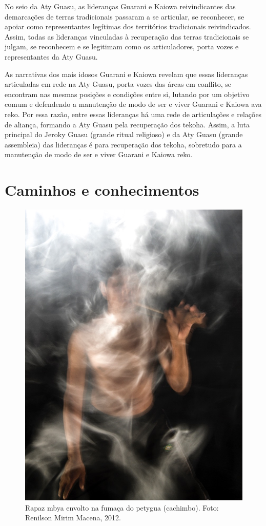 No seio da Aty Guasu, as lideranças Guarani e Kaiowa reivindicantes das
demarcações de terras tradicionais passaram a se articular, se
reconhecer, se apoiar como representantes legítimas dos territórios
tradicionais reivindicados. Assim, todas as lideranças vinculadas à
recuperação das terras tradicionais se julgam, se reconhecem e se
legitimam como os articuladores, porta vozes e representantes da Aty
Guasu. 

As narrativas dos mais idosos Guarani e Kaiowa revelam que essas
lideranças articuladas em rede na Aty Guasu, porta vozes das áreas em
conflito, se encontram nas mesmas posições e condições entre si,
lutando por um objetivo comum e defendendo a manutenção de modo de ser
e viver Guarani e Kaiowa ava reko. Por essa razão, entre essas
lideranças há uma rede de articulações e relações de aliança, formando
a Aty Guasu pela recuperação dos tekoha. Assim, a luta principal do
Jeroky Guasu (grande ritual religioso) e da Aty Guasu (grande
assembleia) das lideranças é para recuperação dos tekoha, sobretudo
para a manutenção de modo de ser e viver Guarani e Kaiowa reko.

\part{Caminhos e conhecimentos}

 \begin{figure}
  \centering
 \includegraphics[width=\textwidth]{./img/GUARANIS-img3.jpg}	
  \hfill
  \caption{Rapaz mbya envolto na fumaça do petygua (cachimbo). Foto: Renilson
Mirim Macena, 2012.}
\end{figure}




